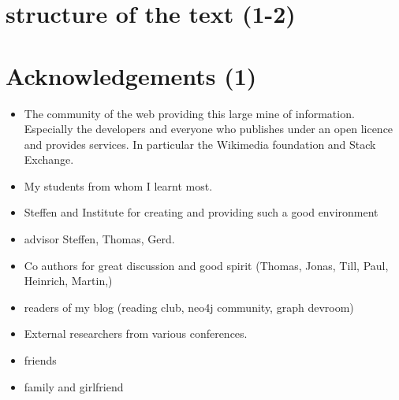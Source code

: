 \documentclass[•]{book}
\begin{document}
\section{structure of the text (1-2)}

\section{Acknowledgements (1)}
\begin{itemize}
\item The community of the web providing this large mine of information. Especially the developers and everyone who publishes under an open licence and provides services. In particular the Wikimedia foundation and Stack Exchange. 
\item My students from whom I learnt most.
\item Steffen and Institute for creating and providing such a good environment
\item advisor Steffen, Thomas, Gerd.
\item Co authors for great discussion and good spirit (Thomas, Jonas, Till, Paul, Heinrich, Martin,)
\item readers of my blog (reading club, neo4j community, graph devroom)
\item External researchers from various conferences.\item friends
\item family and girlfriend

\end{itemize}

\newcommand{\intersection}{\cap}
\newcommand{\union}{\cup}
\newcommand{\skp}{\_}
\newcommand{\pow}[1]{2^{#1}}


\end{document}
